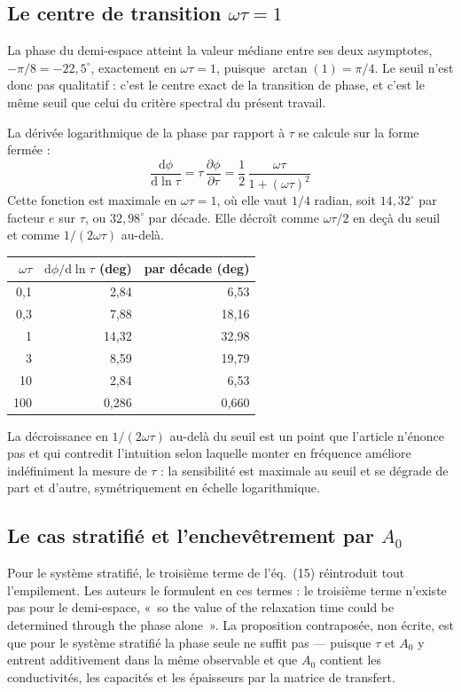 \documentclass[11pt,a4paper]{article}
\begin{document}
\subsection{Le centre de transition \texorpdfstring{$\omega\tau = 1$}{omega tau = 1}}

La phase du demi-espace atteint la valeur médiane entre ses deux asymptotes,
$-\pi/8 = -22{,}5^\circ$, exactement en $\omega\tau = 1$, puisque $\arctan(1) = \pi/4$. Le seuil
n'est donc pas qualitatif : c'est le centre exact de la transition de phase, et c'est le même
seuil que celui du critère spectral du présent travail.

La dérivée logarithmique de la phase par rapport à $\tau$ se calcule sur la forme fermée :
\[
\frac{\mathrm{d}\phi}{\mathrm{d}\ln\tau} = \tau\,\frac{\partial\phi}{\partial\tau}
= \frac{1}{2}\,\frac{\omega\tau}{1+(\omega\tau)^2}
\]
Cette fonction est maximale en $\omega\tau = 1$, où elle vaut $1/4$ radian, soit
$14{,}32^\circ$ par facteur $e$ sur $\tau$, ou $32{,}98^\circ$ par décade. Elle décroît comme
$\omega\tau/2$ en deçà du seuil et comme $1/(2\omega\tau)$ au-delà.

\smallskip
{\small\centering
\begin{tabular}{@{}rrr@{}}
\toprule
$\omega\tau$ & $\mathrm{d}\phi/\mathrm{d}\ln\tau$ (deg) & par décade (deg) \\
\midrule
0,1 & 2,84 & 6,53 \\
0,3 & 7,88 & 18,16 \\
1 & 14,32 & 32,98 \\
3 & 8,59 & 19,79 \\
10 & 2,84 & 6,53 \\
100 & 0,286 & 0,660 \\
\bottomrule
\end{tabular}\par}

\smallskip
La décroissance en $1/(2\omega\tau)$ au-delà du seuil est un point que l'article n'énonce pas et
qui contredit l'intuition selon laquelle monter en fréquence améliore indéfiniment la mesure de
$\tau$ : la sensibilité est maximale au seuil et se dégrade de part et d'autre, symétriquement
en échelle logarithmique.

\subsection{Le cas stratifié et l'enchevêtrement par \texorpdfstring{$A_0$}{A0}}

Pour le système stratifié, le troisième terme de l'éq.~(15) réintroduit tout l'empilement. Les
auteurs le formulent en ces termes : le troisième terme n'existe pas pour le demi-espace, «~so
the value of the relaxation time could be determined through the phase alone~». La proposition
contraposée, non écrite, est que pour le système stratifié la phase seule ne suffit pas ---
puisque $\tau$ et $A_0$ y entrent additivement dans la même observable et que $A_0$ contient les
conductivités, les capacités et les épaisseurs par la matrice de transfert.
\end{document}
